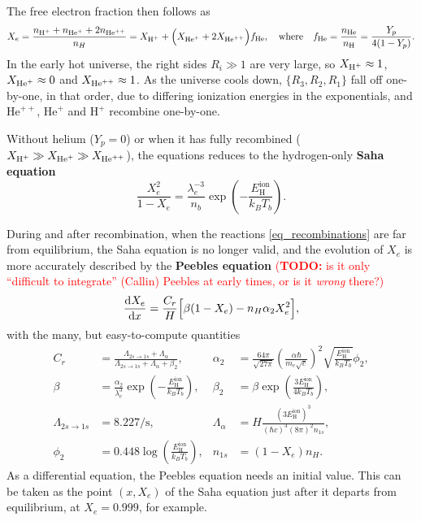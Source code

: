 \documentclass[10pt,a4paper]{article}
\newcommand\TODO[1]{\textcolor{red}{(\textbf{TODO:} #1)}}
\begin{document}
The free electron fraction then follows as
\begin{equation}
    X_e = \frac{n_{\text{H}^+} + n_{\text{He}^+} + 2 n_{\text{He}^{++}}}{n_H} = X_{\text{H}^+} +  \Big( X_{\text{He}^+} + 2 X_{\text{He}^{++}} \Big) f_\text{He}, \quad \text{where} \quad f_\text{He} = \frac{n_\text{He}}{n_\text{H}} = \frac{Y_p}{4(1-Y_p)}.
\label{eq_Saha_H_He_Xe}
\end{equation}
In the early hot universe, the right sides $R_i \gg 1$ are very large, so $X_{\text{H}^+} \approx 1$, $X_{\text{He}^+} \approx 0$ and $X_{\text{He}^{++}} \approx 1$.
As the universe cools down, $\{R_3, R_2, R_1\}$ fall off one-by-one, in that order, due to differing ionization energies in the exponentials,
and $\text{He}^{++}$, $\text{He}^+$ and $\text{H}^+$ recombine one-by-one.

Without helium ($Y_p=0$) or when it has fully recombined ($X_{\text{H}^+} \gg X_{\text{He}^+} \gg X_{\text{He}^{++}}$),
the equations reduces to the hydrogen-only \textbf{Saha equation}
\begin{equation}
	\frac{X_e^2}{1-X_e} = \frac{\lambda_e^{-3}}{n_b} \exp \left( -\frac{E^\text{ion}_\text{H}}{k_B T_b} \right).
\label{eq_saha_H}
\end{equation}

During and after recombination, when the reactions \eqref{eq_recombinations} are far from equilibrium,
the Saha equation is no longer valid,
and the evolution of $X_e$ is more accurately described by the \textbf{Peebles equation}
\TODO{is it only ``difficult to integrate'' (Callin) Peebles at early times, or is it \emph{wrong} there?}
\begin{equation}
	\odv{X_e}{x} = \frac{C_r}{H} \Big[ \beta (1-X_e) - n_H \alpha_2 X_e^2 \Big],
\label{eq_Peebles}
\end{equation}
with the many, but easy-to-compute quantities
\begin{align*}
	C_r &= \frac{\Lambda_{2s \rightarrow 1s} + \Lambda_\alpha}{\Lambda_{2s \rightarrow 1s} + \Lambda_\alpha + \beta_2}, &
	\alpha_2 &= \frac{64 \pi}{\sqrt{27 \pi}} \left(\frac{\alpha \hbar}{m_e \sqrt{c}}\right)^2 \sqrt{\frac{E^\text{ion}_\text{H}}{k_B T_b}} \phi_2, \\
	\beta &= \frac{\alpha_2}{\lambda_e^3} \exp \left(-\frac{E^\text{ion}_\text{H}}{k_B T_b}\right), &
	\beta_2 &= \beta \exp \left(\frac{3 E^\text{ion}_\text{H}}{4 k_B T_b}\right), \\
	\Lambda_{2s \rightarrow 1s} &= 8.227 / \mathrm{s}, &
	\Lambda_\alpha &= H \frac{(3 E^\text{ion}_{\text{H}})^3}{(\hbar c)^3 (8 \pi)^2 n_{1s}}, \\
	\phi_2 &= 0.448 \log \left( \frac{E^\text{ion}_\text{H}}{k_B T_b} \right), &
	n_{1s} &= (1-X_e) n_H.
\end{align*}
As a differential equation, the Peebles equation needs an initial value.
This can be taken as the point $(x, X_e)$ of the Saha equation just after it departs from equilibrium, at $X_e = 0.999$, for example.
\end{document}
